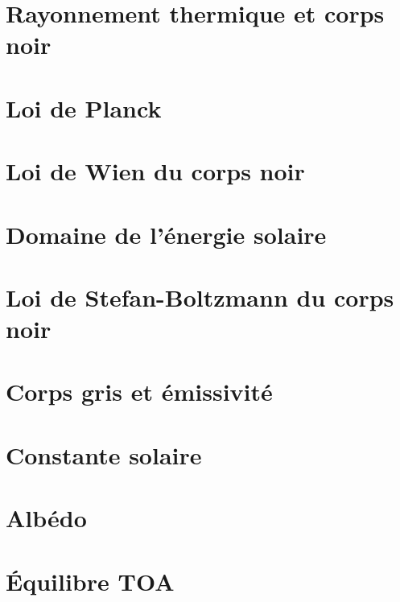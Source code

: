 \documentclass[a4paper,DIV16,10pt]{scrartcl}
\begin{document}
 \inidoc

\begin{detail}
\newpage
\section{Rayonnement thermique et corps noir}


\section{Loi de Planck}

\newpage
\section{Loi de Wien du corps noir}

\newpage
\section{Domaine de l'énergie solaire}

\newpage
\section{Loi de Stefan-Boltzmann du corps noir}

\section{Corps gris et émissivité}

\end{detail}

\newpage
\section{Constante solaire}



\newpage 
\section{Albédo} 


\newpage
\section{\'Equilibre TOA}

\end{document}
